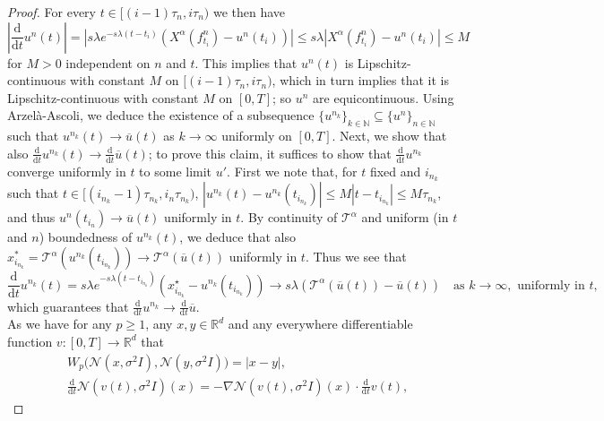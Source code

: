 \documentclass[reqno]{amsart}
\numberwithin{algorithm}{section}
\newcommand{\diff}{\mathrm{d}}
\newcommand{\R}{\mathbb{R}}
\begin{document}
{\begin{proof}
For every $t \in [(i-1)\tau_n, i\tau_n)$ we then have 
$$
\left| \frac{\diff}{\diff t} u^n(t) \right|  = \left|s\lambda e^{-s\lambda(t-t_i)} (X^\alpha(f^n_{t_i}) - u^n(t_i))\right|\leq s\lambda |X^\alpha(f^n_{t_i}) - u^n(t_i)| \leq M $$
for $M>0$ independent on $n$ and $t$.
This implies that $u^n(t)$ is Lipschitz-continuous with constant $M$ on $[(i-1)\tau_n, i\tau_n)$, which in turn implies that it is Lipschitz-continuous with constant $M$ on $[0,T]$; so $u^n$ are equicontinuous.
Using Arzel\`a-Ascoli, we deduce the existence of a subsequence 
$\{u^{n_k}\}_{k\in\mathbb N}\subseteq \{u^n\}_{n\in\mathbb N}$ such that  $u^{n_k}(t) \to \overline{u}(t)$ as $k\to\infty$ uniformly on $[0,T]$.
Next, we show that also $\frac{\diff}{\diff t}u^{n_k}(t) \to \frac{\diff}{\diff t}\overline{u}(t)$; to prove this claim, it suffices to show that $\frac{\diff}{\diff t}u^{n_k}$ converge uniformly in $t$ to some limit $u'$. First we note that, for $t$ fixed and $i_{n_k}$ such that $t \in [(i_{n_k}-1)\tau_{n_k}, i_n\tau_{n_k})$, $|u^{n_k}(t) - u^{n_k}(t_{i_{n_k}}) | \leq M|t-t_{i_{n_k}}| \leq M\tau_{n_k}$, and thus $u^n(t_{i_n}) \to \overline{u}(t)$ uniformly in $t$. By continuity of $\mathcal T^\alpha$ and uniform (in $t$ and $n$) boundedness of $u^{n_k}(t)$, we deduce that also $x_{i_{n_k}}^* = \mathcal T^\alpha(u^{n_k}(t_{i_{n_k}})) \to \mathcal T^\alpha(\overline{u}(t))$ uniformly in $t$. Thus we see that 
\begin{equation*}
    \frac{\diff}{\diff t}u^{n_k}(t) = s \lambda e^{-s \lambda (t - t_{i_{n_k}})} (x_{i_{n_k}}^\star - u^{n_k}(t_{i_{n_k}})) \to s \lambda (\mathcal T^\alpha(\overline{u}(t)) - \overline{u}(t)) \quad \text{as } k \to \infty, \text{ uniformly in } t,
\end{equation*}
which guarantees that $\frac{\diff}{\diff t}u^{n_k} \to \frac{\diff}{\diff t}\overline{u}$. \\
As we have for any $p \geq 1$, any $x, y \in \R^d$ and any everywhere differentiable function $v\colon [0,T] \to \R^d$ that
\begin{align}
    &W_p\big(\mathcal N(x, \sigma^2 I), \mathcal N(y, \sigma^2 I)\big) = |x - y|, \label{eq:Wasserstein_between_gaussians}\\
    &\frac{\diff}{\diff t} \mathcal N(v(t), \sigma^2 I)(x) = -\nabla \mathcal N(v(t), \sigma^2 I)(x) \cdot \frac{\diff}{\diff t} v(t), \label{eq:derivative_of_gaussian}
\end{align}

\end{proof}}
\end{document}

